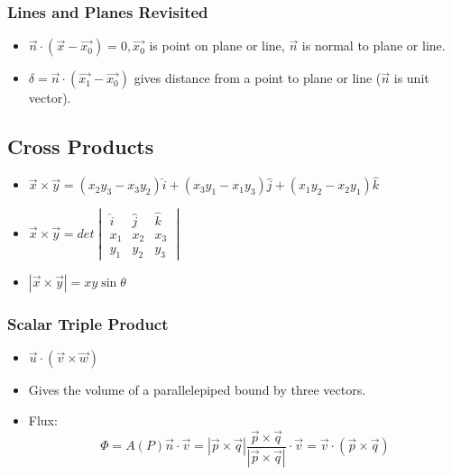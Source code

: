 \documentclass[11pt]{article}
\begin{document}
		\subsubsection*{Lines and Planes Revisited}
			\begin{itemize}
				\item $\vec{n}\cdot(\vec{x}-\vec{x_0}) = 0, \vec{x_0}$ is point on plane or line, $\vec{n}$ is normal to plane or line.
				\item $\delta = \vec{n}\cdot(\vec{x_1}-\vec{x_0})$ gives distance from a point to plane or line ($\vec{n}$ is unit vector).
			\end{itemize}
			
	\subsection*{Cross Products}
		\begin{itemize}
			\item $\vec{x}\times\vec{y} = (x_2y_3-x_3y_2)\hat{i}+(x_3y_1-x_1y_3)\hat{j}+(x_1y_2-x_2y_1)\hat{k}$
			\item $\vec{x}\times\vec{y} = det
		\begin{vmatrix}
			\hat{i} & \hat{j} & \hat{k}\\
			x_1 & x_2 & x_3\\
			y_1 & y_2 & y_3
		\end{vmatrix}$
			\item $|\vec{x}\times\vec{y}| = xy\sin\theta$
		\end{itemize}
		
		\subsubsection*{Scalar Triple Product}
			\begin{itemize}
				\item $\vec{u}\cdot(\vec{v}\times\vec{w})$
				\item Gives the volume of a parallelepiped bound by three vectors.
				\item Flux: \[\Phi = A(P)\vec{n}\cdot\vec{v} = |\vec{p}\times\vec{q}|\frac{\vec{p}\times\vec{q}}{|\vec{p}\times\vec{q}|}\cdot\vec{v} = \vec{v}\cdot(\vec{p}\times\vec{q})\]
			\end{itemize}
\end{document}
